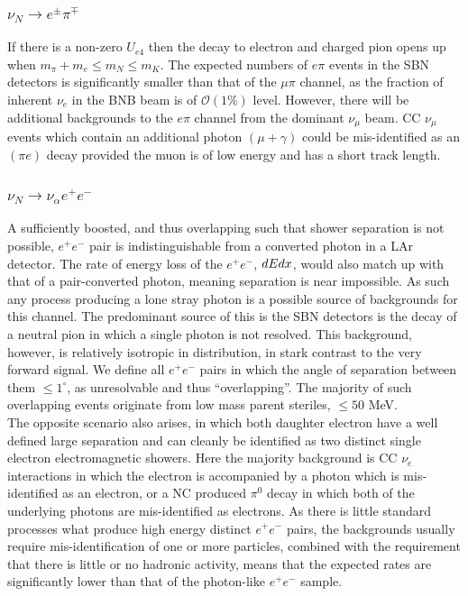 \documentclass[11pt, a4paper]{article}
\begin{document}
\subsubsection{$\nu_N \rightarrow e^\pm \pi^\mp$ }
If there is a non-zero $U_{e4}$ then the decay to electron and charged pion opens up when $m_\pi +m_e \leq m_N \leq m_K$. The expected numbers of $e \pi$ events in the SBN detectors is significantly smaller than that of the $\mu \pi$ channel, as the fraction of inherent $\nu_e$ in the BNB beam is of $\mathcal{O}(1\%)$ level. However, there will be additional backgrounds to the $e \pi$ channel from the dominant $\nu_\mu$ beam. CC $\nu_\mu$ events which contain an additional photon $(\mu+\gamma)$ could be mis-identified as an $(\pi e)$ decay provided the muon is of low energy and has a short track length.

\subsubsection{$\nu_N \rightarrow \nu_\alpha e^+ e^-$ }
A sufficiently boosted, and thus overlapping such that shower separation is not possible, $e^+e^-$ pair is indistinguishable from a converted photon in a LAr detector. The rate of energy loss of the $e^+e^-$, $dE\/dx$, would also match up with that of a pair-converted photon, meaning separation is near impossible.  As such any process producing a lone stray photon is a possible source of backgrounds for this channel. The predominant source of this is the SBN detectors is the decay of a neutral pion in which a single photon is not resolved. This background, however, is relatively isotropic in distribution, in stark contrast to the very forward signal. We define all $e^+e^-$ pairs in which the angle of separation between them $\leq 1^\circ$\cite{Spitz:2011wba}, as unresolvable and thus ``overlapping''. The majority of such overlapping events originate from low mass parent steriles, $\leq 50$ MeV.\\
	

The opposite scenario also arises, in which both daughter electron have a well defined large separation and can cleanly be identified as two distinct single electron electromagnetic showers. Here the majority background is CC $\nu_e$ interactions in which the electron is accompanied by a photon which is mis-identified as an electron, or a NC produced $\pi^0$ decay in which both of the underlying photons are mis-identified as electrons. As there is little standard processes what produce high energy distinct $e^+e^-$ pairs, the backgrounds usually require mis-identification of one or more particles, combined with the requirement that there is little or no hadronic activity, means that the expected rates are significantly lower than that of the photon-like $e^+e^-$ sample.
\end{document}
